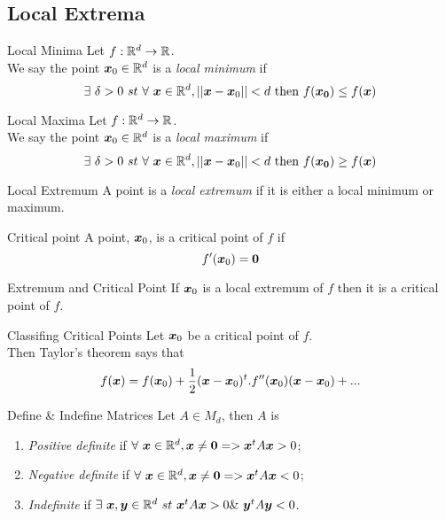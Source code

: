 \documentclass[11pt,a4paper]{article}
\begin{document}
\subsection{Local Extrema}

\subtitle{Definition 15.03 - }{Local Minima}
Let $f : \mathbb{R}^d \to \mathbb{R}$.\\
We say the point $\boldsymbol{x}_0 \in \mathbb{R}^d$ is a \textit{local minimum} if
$$\exists\ \delta > 0\ st\ \forall\ \boldsymbol{x} \in \mathbb{R}^d, ||\boldsymbol{x} - \boldsymbol{x}_0|| < d \mathrm{\ then\ } f(\boldsymbol{x_0}) \leq f(\boldsymbol{x})$$

\subtitle{Definition 15.04 - }{Local Maxima}
Let $f : \mathbb{R}^d \to \mathbb{R}$.\\
We say the point $\boldsymbol{x}_0 \in \mathbb{R}^d$ is a \textit{local maximum} if
$$\exists\ \delta > 0\ st\ \forall\ \boldsymbol{x} \in \mathbb{R}^d, ||\boldsymbol{x} - \boldsymbol{x}_0|| < d \mathrm{\ then\ } f(\boldsymbol{x_0}) \geq f(\boldsymbol{x})$$

\subtitle{Definition 15.05 - }{Local Extremum}
A point is a \textit{local extremum} if it is either a local minimum or maximum.\\

\subtitle{Definition 15.06 - }{Critical point}
A point, $\boldsymbol{x}_0$, is a critical point of $f$ if $$f'(\boldsymbol{x}_0) = \boldsymbol{0}$$

\subtitle{Proposition 15.07 - }{Extremum and Critical Point}
If $\boldsymbol{x}_0$ is a local extremum of $f$ then it is a critical point of $f$.\\

\subtitle{Remark 15.08 - }{Classifing Critical Points}
Let $\boldsymbol{x}_0$ be a critical point of $f$.\\
Then Taylor's theorem says that
$$f(\boldsymbol{x}) = f(\boldsymbol{x}_0) + \frac{1}{2}(\boldsymbol{x} - \boldsymbol{x}_0)^t.f''(\boldsymbol{x}_0)(\boldsymbol{x} - \boldsymbol{x}_0) + ...$$

\subtitle{Definition 15.09 - }{Define \& Indefine Matrices}
Let $A \in M_d$, then $A$ is
\begin{enumerate}[label=\roman*)]
  \item \textit{Positive definite} if $\forall\ \vect{x} \in \real^d, \vect{x} \not = \vect{0} => \vect{x}^tA\vect{x} > 0$;
  \item \textit{Negative definite} if $\forall\ \vect{x} \in \real^d, \vect{x} \not = \vect{0} => \vect{x}^tA\vect{x} < 0$;
  \item \textit{Indefinite} if $\exists\ \vect{x}, \vect{y} \in \real^d\ st\ \vect{x}^tA\vect{x} > 0 \&\ \vect{y}^tA\vect{y} < 0$.
\end{enumerate}
\end{document}
